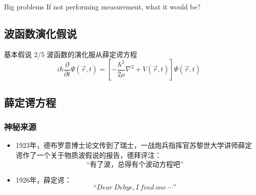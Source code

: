 \begin{frame}
    \centering
    \begin{atcbox}{Big problems}
        {
      If not performing measurement, what it would be? 
    }
    \end{atcbox}
\end{frame}

\subsection{波函数演化假说}

\begin{frame}
    \begin{atcbox}{基本假说 2/5}
        波函数的演化服从薛定谔方程
        \begin{equation*}
            i\hbar \frac{\partial }{\partial t} \Psi (\overrightarrow{r},t ) =\left [ -\frac{\hbar^2}{2\mu }\nabla ^2 + V(\overrightarrow{r},t ) \right ]\Psi (\overrightarrow{r}, t ) 
        \end{equation*}
    \end{atcbox}
\end{frame}

\subsection{薛定谔方程}

\begin{frame}
    \frametitle{神秘来源}
    \begin{itemize}
         \item 1923年，德布罗意博士论文传到了瑞士，一战炮兵指挥官苏黎世大学讲师薛定谔作了一个关于物质波假说的报告，德拜评注：\\
        $$\text{“有了波，总得有个波动方程吧”}$$
         \item 1926年，薛定谔：
        $$“Dear~Debye, I~find~one~\cdots”$$
    \end{itemize}            
\end{frame}

